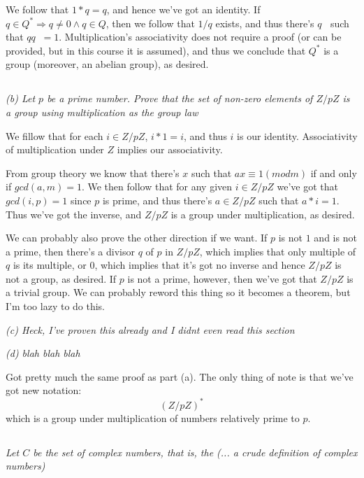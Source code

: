 \documentclass[11pt,oneside,titlepage]{book}
\DeclareMathOperator \inv {^{-1}}
\DeclareMathOperator \ra {\Rightarrow}
\begin{document}
We follow that $1 * q = q$, and hence we've got an identity.  If $q
\in Q^* \ra q \neq 0 \land q \in Q$, then we follow that $1/q$ exists,
and thus there's $q\inv$ such that $q q\inv = 1$. Multiplication's
associativity does not require a proof (or can be provided, but in
this course it is assumed), and thus we conclude that $Q^*$ is a group
(moreover, an abelian group), as desired.

\subsection{}

\textit{(b) Let $p$ be a prime number. Prove that the set of non-zero
  elements of $Z/pZ$ is a group using multiplication as the group law}

We fillow that for each $i \in Z/pZ$, $i * 1 = i$, and thus $i$ is our
identity. Associativity of multiplication under $Z$ implies our associativity.

From group theory we know that there's $x$ such that $ax \equiv 1 (mod
m)$ if and only if $gcd(a, m) = 1$.
We then follow that for any given $i \in Z/pZ$ we've got that
$gcd(i, p) = 1$ since $p$ is prime, and thus there's $a \in Z/pZ$
such that $a * i = 1$. Thus we've got the inverse, and $Z/pZ$ is a
group under multiplication, as desired.

We can probably also prove the other direction if we want. If $p$ is
not $1$ and is not a prime, then there's a divisor $q$ of $p$ in
$Z/pZ$, which implies that only multiple of $q$ is its multiple, or
$0$, which implies that it's got no inverse and hence $Z/pZ$ is not a
group, as desired. If $p$ is not a prime, however, then we've got that
$Z/pZ$ is a trivial group. We can probably reword this thing so it
becomes a theorem, but I'm too lazy to do this.

\textit{(c) Heck, I've proven this already and I didnt even read this section}

\textit{(d) blah blah blah}

Got pretty much the same proof as part (a). The only thing of note is
that we've got new notation:
$$(Z/pZ)^*$$
which is a group under multiplication of numbers relatively prime to $p$.

\subsection{}

\textit{Let $C$ be the set of complex numbers, that is, the (... a
crude definition of complex numbers)}
\end{document}
